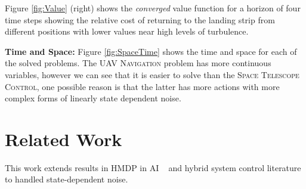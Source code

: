 \documentclass[letterpaper]{article}
\begin{document}
Figure \ref{fig:Value} (right) shows the \emph{converged} value
function for a horizon of four time steps showing the 
relative cost of returning to the landing strip from different
positions with lower values near high levels of turbulence.

\textbf{Time and Space:} Figure \ref{fig:SpaceTime} shows the time and
space for each of the solved problems.  The \textsc{UAV Navigation}
problem has more continuous variables, however we can see that it is
easier to solve than the \textsc{Space Telescope Control}, one
possible reason is that the latter has more actions with more
complex forms of linearly state dependent noise.

\section{Related Work}



This work extends results in HMDP in AI
~\cite{boyan01,feng04,li05,kveton06,phase07,hao09,sdp_aaai} and hybrid
system control literature~\cite{Henzinger:1997,Hu:2000,DeSHee:2009}
to handled state-dependent noise.
\end{document}
